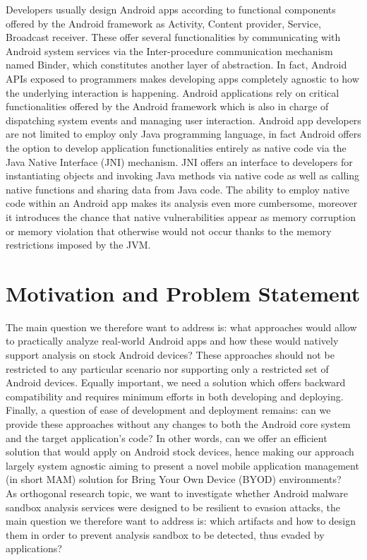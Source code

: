 Developers usually design Android apps according to functional components offered by the Android framework as Activity, Content provider, Service, Broadcast receiver. These offer several functionalities by communicating with Android system services via the Inter-procedure communication mechanism named Binder, which constitutes another layer of abstraction. In fact, Android APIs exposed to programmers makes developing apps completely agnostic to how the underlying interaction is happening. Android applications rely on critical functionalities offered by the Android framework which is also in charge of dispatching system events and managing user interaction. Android app developers are not limited to employ only Java programming language, in fact Android offers the option to develop application functionalities entirely as native code via the Java Native Interface (JNI) mechanism. JNI offers an interface to developers for instantiating objects and invoking Java methods via native code as well as calling native functions and sharing data from Java code. The ability to employ native code within an Android app makes its analysis even more cumbersome, moreover it introduces the chance that native vulnerabilities appear as memory corruption or memory violation that otherwise would not occur thanks to the memory restrictions imposed by the JVM.


\section{Motivation and Problem Statement}

The main question we therefore want to address is: what approaches would allow to practically analyze real-world Android apps and how these would natively support analysis on stock Android devices? These approaches should not be restricted to any particular scenario nor supporting only a restricted set of Android devices. Equally important, we need a solution which offers backward compatibility and requires minimum efforts in both developing and deploying. Finally, a question of ease of development and deployment remains: can we provide these approaches without any changes to both the Android core system and the target application's code? In other words, can we offer an efficient solution that would apply on Android stock devices, hence making our approach largely system agnostic aiming to present a novel mobile application management (in short MAM) solution for Bring Your Own Device (BYOD) environments? \\
As orthogonal research topic, we want to investigate whether Android malware sandbox analysis services were designed to be resilient to evasion attacks, the main question we therefore want to address is: which artifacts and how to design them in order to prevent analysis sandbox to be detected, thus evaded by applications? 

